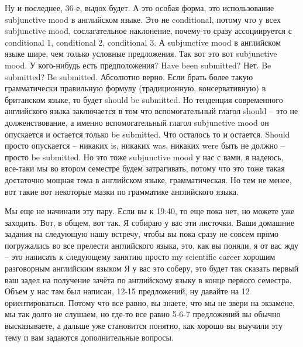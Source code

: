 \documentclass[main.tex]{subfiles}
\begin{document}
Ну и последнее, 36-е, выдох будет.
А это особая форма, это использование subjunctive mood в английском языке.
Это не conditional, потому что у всех subjunctive mood, сослагательное наклонение, почему-то сразу ассоциируется с conditional 1, conditional 2, conditional 3.
А subjunctive mood в английском языке шире, чем только условные предложения.
Так вот это вот subjunctive mood.
У кого-нибудь есть предположения? Have been submitted? Нет.
Be submitted? Be submitted.
Абсолютно верно.
Если брать более такую грамматически правильную формулу (традиционную, консервативную) в британском языке, то будет should be submitted.
Но тенденция современного английского языка заключается в том что вспомогательный глагол should -- это не долженствование, а именно вспомогательный глагол subjunctive mood он опускается и остается только be submitted.
Что осталось то и остается.
Should просто опускается -- никаких is, никаких was, никаких were быть не должно -- просто be submitted.
Но это тоже subjunctive mood у нас с вами, я надеюсь, все-таки мы во втором семестре будем затрагивать, потому что это тоже такая достаточно мощная тема в английском языке, грамматическая.
Но тем не менее, вот такие вот некоторые мазки по грамматике английского языка.

Мы еще не начинали эту пару.
Если вы к 19:40, то еще пока нет, но можете уже заходить.
Вот, в общем, вот так.
Я собираю у вас эти листочки.
Ваши домашние задания на следующую нашу встречу, чтобы вы пока сразу не совсем прямо погружались во все прелести английского языка, это, как вы поняли, я от вас жду -- это написать к следующему занятию просто my scientific career хорошим разговорным английским языком
Я у вас это соберу, это будет так сказать первый ваш задел на получение зачёта по английскому языку в конце первого семестра.
Объем у нас там был написан, 12-15 предложений, ну давайте на 12 ориентироваться.
Потому что все равно, вы знаете, что мы не звери на экзамене, мы так долго не слушаем, но где-то все равно 5-6-7 предложений вы обычно высказываете, а дальше уже становится понятно, как хорошо вы выучили эту тему и вам задаются дополнительные вопросы.
\end{document}
